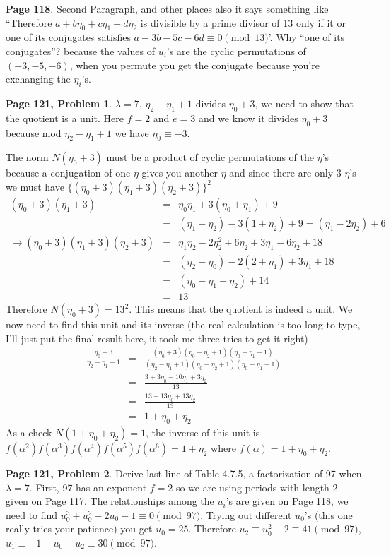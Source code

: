 \documentclass[aps,preprint,preprintnumbers,nofootinbib,showpacs,prd]{revtex4-1}
\newcommand{\nbea}{\begin{eqnarray*}}
\newcommand{\neea}{\end{eqnarray*}}
\begin{document}
{\bf Page 118}. Second Paragraph, and other places also it says something like ``Therefore $a + b\eta_0 + c\eta_1 + d\eta_2$ is divisible by a prime divisor of 13 only if it or one of its conjugates satisfies $a - 3b - 5c - 6d \equiv 0 \pmod{13}$'. Why ``one of its conjugates''? because the values of $u_i$'s are the cyclic permutations of $(-3,-5,-6)$, when you permute you get the conjugate because you're exchanging the $\eta_i$'s.

{\bf Page 121, Problem 1}. $\lambda = 7$, $\eta_2 - \eta_1 + 1$ divides $\eta_0 + 3$, we need to show that the quotient is a unit. Here $f = 2$ and $e = 3$ and we know it divides $\eta_0 + 3$ because mod $\eta_2 - \eta_1 + 1$ we have $\eta_0 \equiv -3$.

The norm $N(\eta_0 + 3)$ must be a product of cyclic permutations of the $\eta$'s because a conjugation of one $\eta$ gives you another $\eta$ and since there are only 3 $\eta$'s we must have $\{(\eta_0 + 3)(\eta_1 + 3)(\eta_2 + 3)\}^2$
%
\nbea
(\eta_0 + 3)(\eta_1 + 3) & = & \eta_0\eta_1 + 3(\eta_0 + \eta_1) + 9 \\
& = & (\eta_1 + \eta_2) - 3(1 + \eta_2) + 9 = (\eta_1 - 2\eta_2) + 6 \\
\to (\eta_0 + 3)(\eta_1 + 3)(\eta_2 + 3) & = & \eta_1\eta_2 - 2\eta_2^2 + 6\eta_2 + 3\eta_1 - 6\eta_2 + 18 \\
& = & (\eta_2 + \eta_0) -2(2 + \eta_1) + 3\eta_1 + 18 \\
& = & (\eta_0 + \eta_1 + \eta_2) + 14 \\
& = & 13
\neea
%
Therefore $N(\eta_0 + 3) = 13^2$. This means that the quotient is indeed a unit. We now need to find this unit and its inverse (the real calculation is too long to type, I'll just put the final result here, it took me three tries to get it right)
%
\nbea
\frac{\eta_0 + 3}{\eta_2 - \eta_1 + 1} & = & \frac{(\eta_0 + 3)(\eta_0 - \eta_2 + 1)(\eta_0 - \eta_1 - 1)}{(\eta_2 - \eta_1 + 1)(\eta_0 - \eta_2 + 1)(\eta_0 - \eta_1 - 1)} \\
& = & \frac{3 + 3\eta_0 - 10\eta_1 + 3\eta_2}{13} \\
& = & \frac{13 + 13\eta_0 + 13\eta_2}{13} \\
& = & 1 + \eta_0 + \eta_2
\neea
%
As a check $N(1 + \eta_0 + \eta_2) = 1$, the inverse of this unit is $f(\alpha^2)f(\alpha^3)f(\alpha^4)f(\alpha^5)f(\alpha^6) = 1 + \eta_2$ where $f(\alpha) = 1 + \eta_0 + \eta_2$.

{\bf Page 121, Problem 2}. Derive last line of Table 4.7.5, a factorization of 97 when $\lambda = 7$. First, 97 has an exponent $f = 2$ so we are using periods with length 2 given on Page 117. The relationships among the $u_i$'s are given on Page 118, we need to find $u_0^3 + u_0^2 - 2u_0 - 1 \equiv 0 \pmod{97}$. Trying out different $u_0$'s (this one really tries your patience) you get $u_0 = 25$. Therefore $u_2 \equiv u_0^2 - 2 \equiv 41 \pmod{97}$, $u_1 \equiv -1 -u_0 - u_2 \equiv 30 \pmod{97}$.
\end{document}
